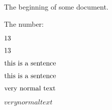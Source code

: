 \documentclass{article}
\begin{document}
The beginning of some document.

The number: 

\mathnumber

\textnumber

$\textnormal{13}$

$\textnormal{13}$

\mathnote

\textnote

$\textnormal{this is a sentence}$

$\textnormal{this is a sentence}$

$\textnormal{very normal text}$

$very normal text$
\end{document}
